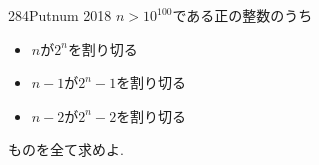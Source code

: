 \begin{thm}{284}{}{Putnum 2018}
    $n>10^{100}$である正の整数のうち
    \begin{itemize}
\item $n$が$2^n$を割り切る
\item $n-1$が$2^{n}-1$を割り切る
\item $n-2$が$2^{n}-2$を割り切る
    \end{itemize}
    ものを全て求めよ. 
\end{thm}

